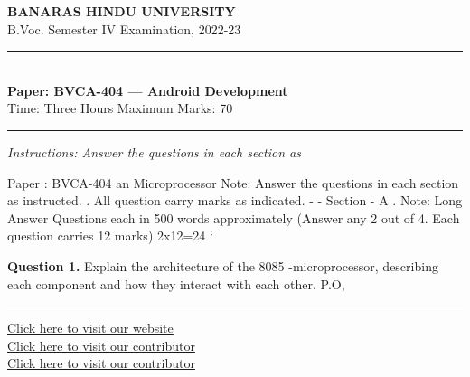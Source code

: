 \documentclass[11pt,a4paper]{article}
\begin{document}
\begin{center}
  {\large\bfseries BANARAS HINDU UNIVERSITY}\\[2pt]
  {\normalsize B.Voc. Semester IV Examination, 2022-23}\\[6pt]
  \rule{0.8\linewidth}{0.5pt}\\[6pt]
  {\large\bfseries Paper: BVCA-404 --- Android Development}\\[4pt]
  {\normalsize Time: Three Hours \hfill Maximum Marks: 70}
\end{center}

\rule{\linewidth}{0.4pt}

\smallskip
\noindent\textit{Instructions: Answer the questions in each section as}

\bigskip

Paper : BVCA-404
an Microprocessor
Note: Answer the questions in each section as
instructed. .
All question carry marks as indicated. -
- Section - A .
Note: Long Answer Questions each in 500 words
approximately (Answer any 2 out of 4. Each
question carries 12 marks) 2x12=24 ‘

\medskip\noindent\textbf{Question 1.} Explain the architecture of the 8085
-microprocessor, describing each component
and how they interact with each other.
P.O,

\vfill
\rule{\linewidth}{0.4pt}
\begin{center}\small
\href{https://bhu-exam.vercel.app/}{Click here to visit our website}\\[4pt]\href{https://me-aryan.vercel.app/}{Click here to visit our contributor}\\[4pt]\href{https://quashan-me.vercel.app/}{Click here to visit our contributor}
\end{center}
\end{document}
